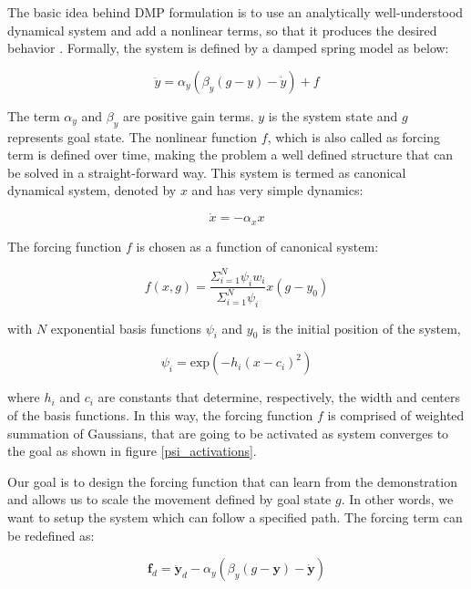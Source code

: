 \documentclass[sigconf]{acmart}
\begin{document}
The basic idea behind DMP formulation is to use an analytically well-understood dynamical system and add a nonlinear terms, so that it produces the desired behavior \cite{ijspeert2013dynamical}. Formally, the system is defined by a damped spring model as below:

\begin{equation}
	\ddot{y} = \alpha_y ( \beta_y (g - y) - \dot{y}) + f
\end{equation}

The term $\alpha_y$ and $\beta_y$ are positive gain terms. $y$ is the system state and $g$ represents goal state. The nonlinear function $f$, which is also called as forcing term is defined over time, making the problem a well defined structure that can be solved in a straight-forward way. This system is termed as canonical dynamical system, denoted by $x$ and has very simple dynamics:

\begin{equation}
	\dot{x} = -\alpha_x x
\end{equation}

The forcing function $f$ is chosen as a function of canonical system:

\begin{equation}
	f(x,g) = \frac{\Sigma_{i=1}^N \psi_i w_i}{\Sigma_{i=1}^N \psi_i} x(g - y_0)
	\label{forcing_func}
\end{equation}

with $N$ exponential basis functions $\psi_i$ and $y_0$ is the initial position of the system,

\begin{equation}
	\psi_i = \textrm{exp}\left( -h_i \left( x - c_i\right)^2 \right)
\end{equation}

where $h_i$ and $c_i$ are constants that determine, respectively, the width and centers of the basis functions. In this way, the forcing function $f$ is comprised of weighted summation of Gaussians, that are going to be activated as system converges to the goal as shown in figure \ref{psi_activations}.

Our goal is to design the forcing function that can learn from the demonstration and allows us to scale the movement defined by goal state $g$. In other words, we want to setup the system which can follow a specified path. The forcing term can be redefined as:

\begin{equation}
	\textbf{f}_d = \ddot{\textbf{y}}_d - \alpha_y ( \beta_y (g - \textbf{y}) - \dot{\textbf{y}})
\end{equation}
\end{document}
